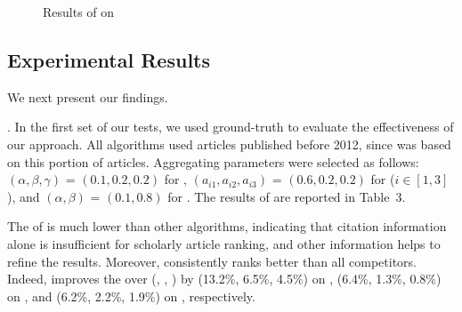 {\begin{figure}[tb!]
\begin{center}
\end{center}
\vspace{-5ex}
\caption{Results of \PairAcc on \magdata}
\label{fig-future-period}
\vspace{-2ex}
\end{figure}
}







\subsection{Experimental Results}
\label{subsec-expres}

We next present our findings.

.
In the first set of our tests, we used ground-truth \recom to evaluate the effectiveness of our approach.
All algorithms used articles published before 2012, since \recom was based on this portion of articles.
Aggregating parameters were selected as follows: $(\alpha,\beta,\gamma)$ = $(0.1, 0.2, 0.2)$ for \futurerank, $(a_{i1},a_{i2},a_{i3})$ = $(0.6, 0.2, 0.2)$ for \hhgrank ($i\in[1,3]$), and $(\alpha,\beta)$ = $(0.1, 0.8)$ for \ensemblerank.
The results of \PairAcc are reported in Table~3.

The \PairAcc of \pagerank is much lower than other algorithms, indicating that citation information alone is insufficient for scholarly article ranking, and other information helps to refine the results. Moreover, \ensemblerank consistently ranks better than all competitors. Indeed, \ensemblerank improves the \PairAcc over (\pagerank, \futurerank, \hhgrank) by (13.2\%, 6.5\%, 4.5\%) on \aan, (6.4\%, 1.3\%, 0.8\%) on \aminer, and (6.2\%, 2.2\%, 1.9\%) on \magdata, respectively.

